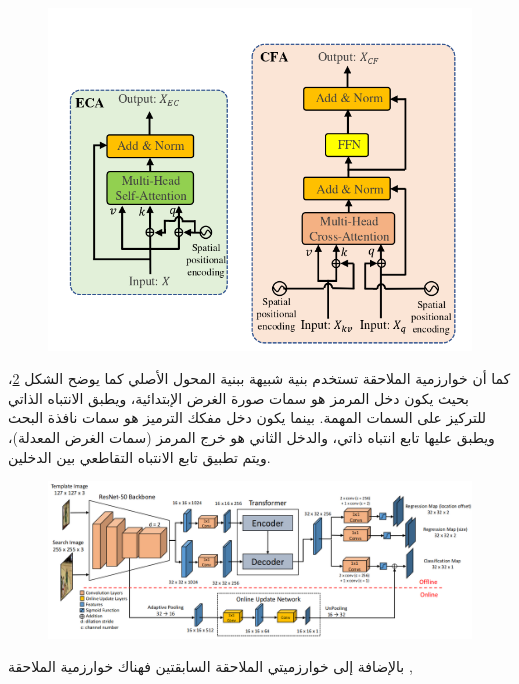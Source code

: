 \begin{figure}[!h]
	\centerline{\includegraphics[scale=0.4]{images/TransT_ECA_CFA.png}}
	\caption{
		}
	\label{fig:TransT_Modules}
\end{figure}
كما أن خوارزمية الملاحقة
تستخدم بنية شبيهة ببنية المحول الأصلي كما يوضح الشكل 
\ref{fig:TrTr}،
بحيث يكون دخل المرمز هو سمات صورة الغرض الإبتدائية، ويطبق الانتباه الذاتي للتركيز على السمات المهمة. بينما يكون دخل مفكك الترميز هو سمات نافذة البحث ويطبق عليها تابع انتباه ذاتي، والدخل الثاني هو خرج المرمز (سمات الغرض المعدلة)، ويتم تطبيق تابع الانتباه التقاطعي بين الدخلين.
\begin{figure}[!h]
	\centerline{\includegraphics[width=\textwidth]{images/TrTr.png}}
	\caption{
	}
	\label{fig:TrTr}
\end{figure}
\newline
بالإضافة إلى خوارزميتي الملاحقة السابقتين فهناك خوارزمية الملاحقة 
,
